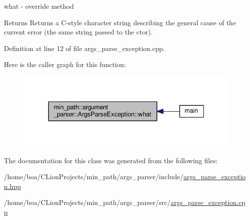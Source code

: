 what -\/ override method 

\begin{DoxyReturn}{Returns}
Returns a C-\/style character string describing the general cause of the current error (the same string passed to the ctor). 
\end{DoxyReturn}


Definition at line 12 of file args\+\_\+parse\+\_\+exception.\+cpp.



Here is the caller graph for this function\+:
\nopagebreak
\begin{figure}[H]
\begin{center}
\leavevmode
\includegraphics[width=325pt]{classmin__path_1_1argument__parser_1_1_args_parse_exception_af541e83d297eb66a959230e739b0349f_icgraph}
\end{center}
\end{figure}




The documentation for this class was generated from the following files\+:\begin{DoxyCompactItemize}
\item 
/home/boa/\+C\+Lion\+Projects/min\+\_\+path/args\+\_\+parser/include/\hyperlink{args__parse__exception_8hpp}{args\+\_\+parse\+\_\+exception.\+hpp}\item 
/home/boa/\+C\+Lion\+Projects/min\+\_\+path/args\+\_\+parser/src/\hyperlink{args__parse__exception_8cpp}{args\+\_\+parse\+\_\+exception.\+cpp}\end{DoxyCompactItemize}
